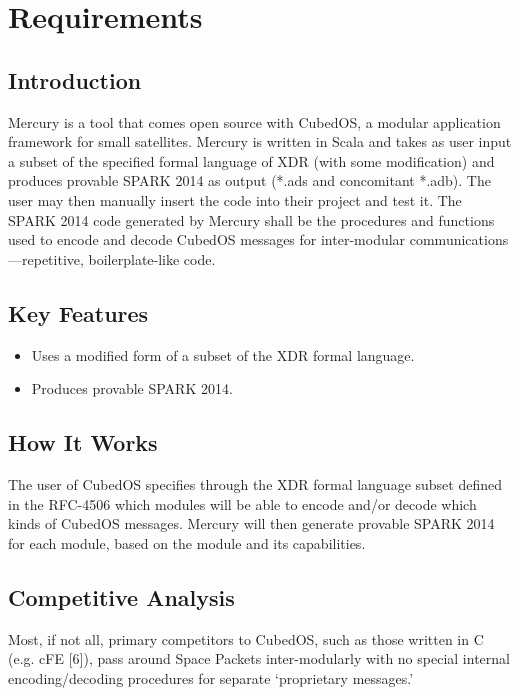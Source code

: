 \section{Requirements}
\label{sec:Mercury-requirements}

\subsection{Introduction}

Mercury is a tool that comes open source with CubedOS, a modular application framework for small
satellites. Mercury is written in Scala and takes as user input a subset of the specified formal
language of XDR (with some modification) and produces provable SPARK 2014 as output (*.ads and
concomitant *.adb). The user may then manually insert the code into their project and test it.
The SPARK 2014 code generated by Mercury shall be the procedures and functions used to encode
and decode CubedOS messages for inter-modular communications—repetitive, boilerplate-like code.

\subsection{Key Features}

\begin{itemize}
\item Uses a modified form of a subset of the XDR formal language.
\item Produces provable SPARK 2014.
\end{itemize}

\subsection{How It Works}

The user of CubedOS specifies through the XDR formal language subset defined in the RFC-4506
which modules will be able to encode and/or decode which kinds of CubedOS messages. Mercury will
then generate provable SPARK 2014 for each module, based on the module and its capabilities.

\subsection{Competitive Analysis}

Most, if not all, primary competitors to CubedOS, such as those written in C (e.g. cFE [6]),
pass around Space Packets inter-modularly with no special internal encoding/decoding procedures
for separate ‘proprietary messages.’


